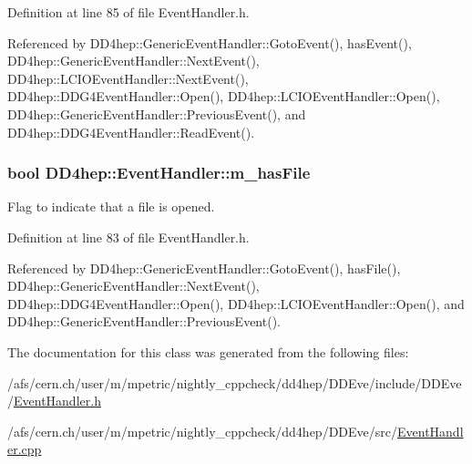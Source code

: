 Definition at line 85 of file EventHandler.h.

Referenced by DD4hep::GenericEventHandler::GotoEvent(), hasEvent(), DD4hep::GenericEventHandler::NextEvent(), DD4hep::LCIOEventHandler::NextEvent(), DD4hep::DDG4EventHandler::Open(), DD4hep::LCIOEventHandler::Open(), DD4hep::GenericEventHandler::PreviousEvent(), and DD4hep::DDG4EventHandler::ReadEvent().\hypertarget{class_d_d4hep_1_1_event_handler_acfb701f8f671fe75df92d46d846613d5}{
\subsubsection[{m\_\-hasFile}]{\setlength{\rightskip}{0pt plus 5cm}bool {\bf DD4hep::EventHandler::m\_\-hasFile}}}
\label{class_d_d4hep_1_1_event_handler_acfb701f8f671fe75df92d46d846613d5}


Flag to indicate that a file is opened. 

Definition at line 83 of file EventHandler.h.

Referenced by DD4hep::GenericEventHandler::GotoEvent(), hasFile(), DD4hep::GenericEventHandler::NextEvent(), DD4hep::DDG4EventHandler::Open(), DD4hep::LCIOEventHandler::Open(), and DD4hep::GenericEventHandler::PreviousEvent().

The documentation for this class was generated from the following files:\begin{DoxyCompactItemize}
\item 
/afs/cern.ch/user/m/mpetric/nightly\_\-cppcheck/dd4hep/DDEve/include/DDEve/\hyperlink{_event_handler_8h}{EventHandler.h}\item 
/afs/cern.ch/user/m/mpetric/nightly\_\-cppcheck/dd4hep/DDEve/src/\hyperlink{_event_handler_8cpp}{EventHandler.cpp}\end{DoxyCompactItemize}
